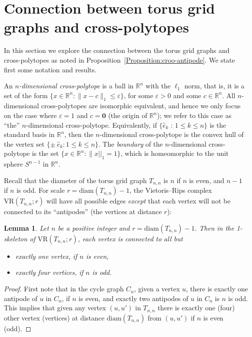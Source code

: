 \documentclass[12pt,a4paper]{amsart}
\newtheorem{lemma}[theorem]{Lemma}
\theoremstyle{definition}
\newcommand{\vr}[2]{\mathrm{VR}(#1;#2)}
\newcommand{\diam}{\ensuremath{\mathrm{diam}}}
\numberwithin{equation}{section}
\begin{document}
\section{Connection between torus grid graphs and cross-polytopes}
\label{sec:cross-polytopes}

In this section we explore the connection between the torus grid graphs and cross-polytopes as noted in Proposition~\ref{Proposition:croo-antipode}.
We state first some notation and results.

An \emph{$n$-dimensional cross-polytope} is a ball in $\mathbb R^n$ with the $\ell_1$ norm, that is, it is a set of the form $\{ x\in \mathbb R^n : \| x - c\|_1 \leq \varepsilon \}$, for some $\varepsilon >0$ and some $c\in \mathbb R^n$.
All $n$-dimensional cross-polytopes are isomorphic equivalent, and hence we only focus on the case where $\varepsilon =1$ and $c = \textbf{0}$ (the origin of $\mathbb R^n$); we refer to this case as ``the'' $n$-dimensional cross-polytope.
Equivalently, if $\{ \hat e_k$ : $1\leq k \leq n\}$ is the standard basis in $\mathbb R^n$, then the $n$-dimensional cross-polytope is the convex hull of the vertex set $\{ \pm \ \hat e_k : 1\leq k \leq n \}$.
The \emph{boundary} of the $n$-dimensional cross-polytope is the set $\{ x\in \mathbb R^n : \|x||_1 = 1 \}$, which is homeomorphic to the unit sphere $S^{n-1}$ in $\mathbb R^n$.

Recall that the diameter of the torus grid graph $T_{n,n}$ is $n$ if $n$ is even, and $n-1$ if $n$ is odd.
For scale $r=\diam(T_{n,n})-1$, the Vietoris--Rips complex $\vr{T_{n,n}}{r}$ will have all possible edges \emph{except} that each vertex will not be connected to its ``antipodes'' (the vertices at distance $r$):

\begin{lemma}
\label{Lemma:VR-antipode}
Let $n$ be a positive integer and $r=\diam(T_{n,n})-1$.
Then in the 1-skeleton of $\vr{T_{n,n}}{r}$, each vertex is connected to all but
\begin{itemize}
    \item exactly one vertex, if $n$ is even,
    \item exactly four vertices, if $n$ is odd.
\end{itemize}
\end{lemma}
\begin{proof}
First note that in the cycle graph $C_n$, given a vertex $u$, there is exactly one antipode of $u$ in $C_n$, if $n$ is even, and exactly two antipodes of $u$ in $C_n$ is $n$ is odd.
This implies that given any vertex $(u,u')$ in $T_{n,n}$ there is exactly one (four) other vertex (vertices) at distance $\diam(T_{n,n})$ from $(u,u')$ if $n$ is even (odd).
\end{proof}
\end{document}
